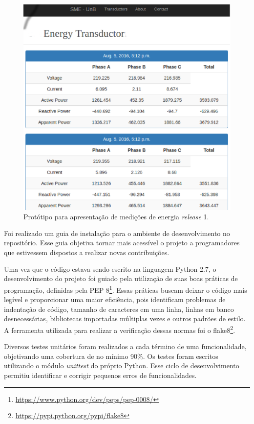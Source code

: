 \begin{figure}[!htb]
    \centering
    \includegraphics[keepaspectratio=true,scale=0.5]{figuras/coleta_dados_01.eps}
    \caption{Protótipo para apresentação de medições de energia \textit{release} 1.}
    \label{dados01}
\end{figure}

Foi realizado um guia de instalação para o ambiente de desenvolvimento no repositório. Esse guia objetiva tornar mais acessível o projeto a programadores que estivessem dispostos a realizar novas contribuições.

Uma vez que o código estava sendo escrito na linguagem Python 2.7, o desenvolvimento do projeto foi guiado pela utilização de suas boas práticas de programação, definidas pela PEP 8\footnote{\url{https://www.python.org/dev/peps/pep-0008/}}. Essas práticas buscam deixar o código mais legível e proporcionar uma maior eficiência, pois identificam problemas de indentação de código, tamanho de caracteres em uma linha, linhas em banco desnecessárias, bibliotecas importadas múltiplas vezes e outros padrões de estilo. A ferramenta utilizada para realizar a verificação dessas normas foi o flake8\footnote{\url{https://pypi.python.org/pypi/flake8}}.

Diversos testes unitários foram realizados a cada término de uma funcionalidade, objetivando uma cobertura de no mínimo 90\%. Os testes foram escritos utilizando o módulo \textit{unittest} do próprio Python. Esse ciclo de desenvolvimento permitiu identificar e corrigir pequenos erros de funcionalidades.

